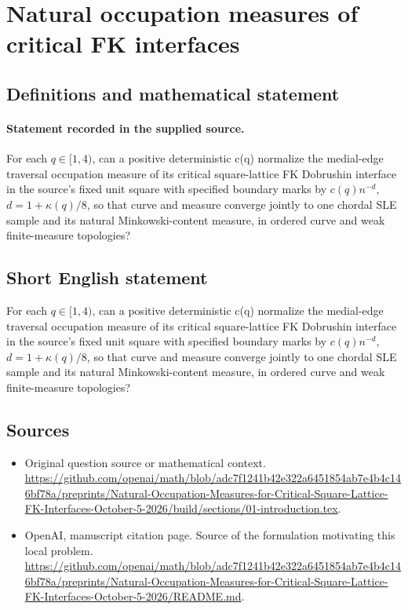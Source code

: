 \documentclass[11pt]{article}
\begin{document}
\section*{Natural occupation measures of critical FK interfaces}\label{30007356}
\subsection{Definitions and mathematical statement}
\paragraph{Statement recorded in the supplied source.}
For each $q\in [1,4)$, can a positive deterministic c(q) normalize the medial-edge traversal occupation measure of its critical square-lattice FK Dobrushin interface in the source's fixed unit square with specified boundary marks by $c(q)n^{-d}$, $d=1+\kappa (q)/8$, so that curve and measure converge jointly to one chordal SLE sample and its natural Minkowski-content measure, in ordered curve and weak finite-measure topologies?
\subsection{Short English statement}
For each $q\in [1,4)$, can a positive deterministic c(q) normalize the medial-edge traversal occupation measure of its critical square-lattice FK Dobrushin interface in the source's fixed unit square with specified boundary marks by $c(q)n^{-d}$, $d=1+\kappa (q)/8$, so that curve and measure converge jointly to one chordal SLE sample and its natural Minkowski-content measure, in ordered curve and weak finite-measure topologies?
\subsection{Sources}
\begin{itemize}
\item[S1] Original question source or mathematical context.
\url{https://github.com/openai/math/blob/adc7f1241b42e322a6451854ab7e4b4c146bf78a/preprints/Natural-Occupation-Measures-for-Critical-Square-Lattice-FK-Interfaces-October-5-2026/build/sections/01-introduction.tex}.
\item[S2] OpenAI, manuscript citation page. Source of the formulation motivating this local problem.
\url{https://github.com/openai/math/blob/adc7f1241b42e322a6451854ab7e4b4c146bf78a/preprints/Natural-Occupation-Measures-for-Critical-Square-Lattice-FK-Interfaces-October-5-2026/README.md}.
\end{itemize}
\end{document}
